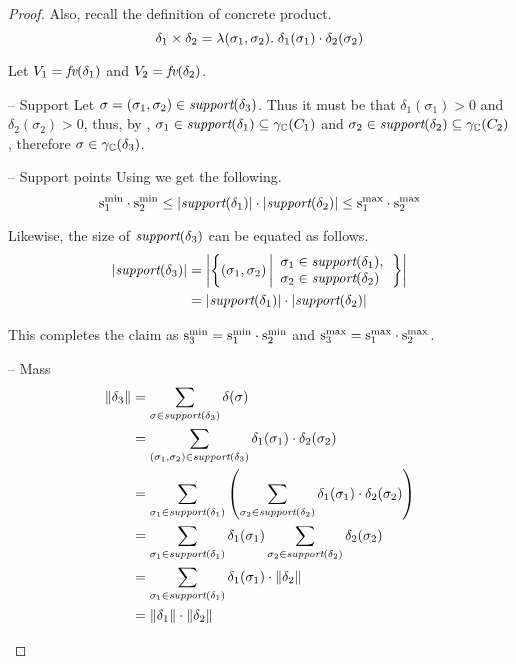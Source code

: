 \begin{proof}
Also, recall the definition of concrete product.
$$ \delta_1 \times \delta_2 = \lambda
(\sigma_1, \sigma_2) . \; \delta_1(\sigma_1) \cdot \delta_2(\sigma_2) $$

Let $ V_1 = \textit{fv}(\delta_1) $ and $ V_2 = \textit{fv}(\delta_2) $.

\begin{subproof}{ -- Support}
Let $ \sigma = (\sigma_1, \sigma_2) \in \textit{support}(\delta_3) $. Thus it must be that
$ \delta_1(\sigma_1) > 0 $ and
$ \delta_2(\sigma_2) > 0 $, thus, by ,
$ \sigma_1 \in \textit{support}(\delta_1) \subseteq \gamma_{\mathbb{C}}(C_1)
$ and
$ \sigma_2 \in \textit{support}(\delta_2) \subseteq \gamma_{\mathbb{C}}(C_2)
$, therefore $ \sigma \in \gamma_{\mathbb{C}}(\delta_3) $.
\end{subproof}

\begin{subproof}{ -- Support points}
Using  we get the following.
$$ \mathrm{s}^\mathrm{min}_{1} \cdot \mathrm{s}^\mathrm{min}_{2} \leq \left| \textit{support}(\delta_1) \right| \cdot \left| \textit{support}(\delta_2) \right| \leq \mathrm{s}^\mathrm{max}_{1} \cdot \mathrm{s}^\mathrm{max}_{2} $$

Likewise, the size of $ \textit{support}(\delta_3) $ can be equated as follows.
\begin{align*}
\left| \textit{support}(\delta_3) \right| & =
 \left| \left\{ (\sigma_1,
 \sigma_2) \left|
\begin{array}{l}
\sigma_1 \in \textit{support}(\delta_1), \\
\sigma_2 \in \textit{support}(\delta_2)
\end{array} \right.  \right\}  \right| \\
 & = \left| \textit{support}(\delta_1) \right| \cdot \left| \textit{support}(\delta_2) \right|
\end{align*}

This completes the claim as $ \mathrm{s}^\mathrm{min}_{3} = \mathrm{s}^\mathrm{min}_{1} \cdot \mathrm{s}^\mathrm{min}_{2} $ and
$ \mathrm{s}^\mathrm{max}_{3} = \mathrm{s}^\mathrm{max}_{1} \cdot \mathrm{s}^\mathrm{max}_{2} $.
\end{subproof}

\begin{subproof}{ -- Mass}
\begin{align*}
\mathord{\parallel}\delta_3\mathord{\parallel}
& = \sum_{\sigma \in \textit{support}(\delta_3)} \delta(\sigma) \\
& = \sum_{(\sigma_1, \sigma_2) \in \textit{support}(\delta_3)} \delta_1(\sigma_1) \cdot \delta_2(\sigma_2) \\
&
= \sum_{\sigma_1 \in \textit{support}(\delta_1)} \left( \sum_{\sigma_2 \in \textit{support}(\delta_2)} \delta_1(\sigma_1) \cdot \delta_2(\sigma_2) \right) \\
&
= \sum_{\sigma_1 \in \textit{support}(\delta_1)} \delta_1(\sigma_1) \sum_{\sigma_2 \in \textit{support}(\delta_2)} \delta_2(\sigma_2) \\
&
= \sum_{\sigma_1 \in \textit{support}(\delta_1)} \delta_1(\sigma_1) \cdot \mathord{\parallel}\delta_2\mathord{\parallel} \\
& = \mathord{\parallel}\delta_1\mathord{\parallel} \cdot \mathord{\parallel}\delta_2\mathord{\parallel}
\end{align*}
\end{subproof}


\end{proof}
